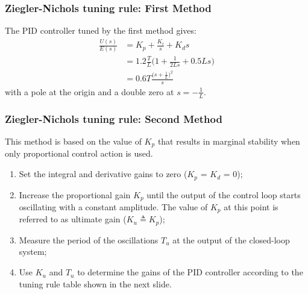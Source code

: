 \begin{frame}
	\frametitle{Ziegler-Nichols tuning rule: First Method}
	The PID controller tuned by the first method gives:
	\vspace{-0.5em}
	\begin{align*}
		\frac{U(s)}{E(s)} &= K_p + \frac{K_i}{s} + K_d s\\
		&= 1.2\frac{T}{L} \big (1 + \frac{1}{2Ls} + 0.5Ls \big)\\
		&= 0.6 T \frac{\big (s + \frac{1}{L} \big)^2}{s}
	\end{align*}
	with a pole at the origin and a double zero at $s = -\frac{1}{L}$.
\end{frame}

\begin{frame}
	\frametitle{Ziegler-Nichols tuning rule: Second Method}
	This method is based on the value of $K_p$ that results in marginal stability when only proportional control action is used.
	\begin{enumerate}
		\item Set the integral and derivative gains to zero ($K_p$ = $K_d$ = 0);
		\item Increase the proportional gain $K_p$ until the output of the control loop starts oscillating with a constant amplitude. The value of $K_p$ at this point is referred to as ultimate gain ($K_u \triangleq K_p$);
		\item Measure the period of the oscillations $T_u$ at the output of the closed-loop system;
		\item Use $K_u$ and $T_u$ to determine the gains of the PID controller according to the tuning rule table shown in the next slide.
	\end{enumerate}
\end{frame}


